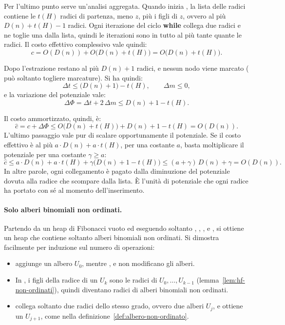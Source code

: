 Per l'ultimo punto serve un'analisi aggregata. Quando inizia \Consolidate{}, la lista delle radici contiene le $t(H)$ radici di partenza, meno $z$, più i figli di $z$, ovvero al più $D(n) + t(H) - 1$ radici. Ogni iterazione del ciclo \textbf{while} collega due radici e ne toglie una dalla lista, quindi le iterazioni sono in tutto al più tante quante le radici. Il costo effettivo complessivo vale quindi:
\[
c = O(D(n)) + O\bigl(D(n) + t(H)\bigr) = O\bigl(D(n) + t(H)\bigr).
\]

Dopo l'estrazione restano al più $D(n) + 1$ radici, e nessun nodo viene marcato (\FibHeapLink{} può soltanto togliere marcature). Si ha quindi:
\[
\Delta t \le \bigl(D(n) + 1\bigr) - t(H), \qquad \Delta m \le 0,
\]
e la variazione del potenziale vale:
\[
\Delta\Phi = \Delta t + 2\,\Delta m \le D(n) + 1 - t(H).
\]

Il costo ammortizzato, quindi, è:
\[
\hat{c} = c + \Delta\Phi \le O\bigl(D(n) + t(H)\bigr) + D(n) + 1 - t(H) = O(D(n)).
\]
L'ultimo passaggio vale pur di scalare opportunamente il potenziale. Se il costo effettivo è al più $a \cdot D(n) + a \cdot t(H)$, per una costante $a$, basta moltiplicare il potenziale per una costante $\gamma \ge a$:
\[
\hat{c} \le a \cdot D(n) + a \cdot t(H) + \gamma \bigl(D(n) + 1 - t(H)\bigr) \le (a + \gamma)\, D(n) + \gamma = O(D(n)).
\]
In altre parole, ogni collegamento è pagato dalla diminuzione del potenziale dovuta alla radice che scompare dalla lista. È l'unità di potenziale che ogni radice ha portato con sé al momento dell'inserimento.

\paragraph{Solo alberi binomiali non ordinati.}
Partendo da un heap di Fibonacci vuoto ed eseguendo soltanto \MakeFibHeap{}, \FibHeapInsert{}, \Minimum{}, \FibHeapUnion{} e \FibHeapExtractMin{}, si ottiene un heap che contiene soltanto alberi binomiali non ordinati. Si dimostra facilmente per induzione sul numero di operazioni:
\begin{itemize}
    \item \FibHeapInsert{} aggiunge un albero $U_0$, mentre \MakeFibHeap{}, \Minimum{} e \FibHeapUnion{} non modificano gli alberi.
    \item In \FibHeapExtractMin{}, i figli della radice di un $U_k$ sono le radici di $U_0, \ldots, U_{k-1}$ (lemma~\ref{lem:hf-non-ordinati}), quindi diventano radici di alberi binomiali non ordinati.
    \item \Consolidate{} collega soltanto due radici dello stesso grado, ovvero due alberi $U_j$, e ottiene un $U_{j+1}$, come nella definizione~\ref{def:albero-non-ordinato}.
\end{itemize}

